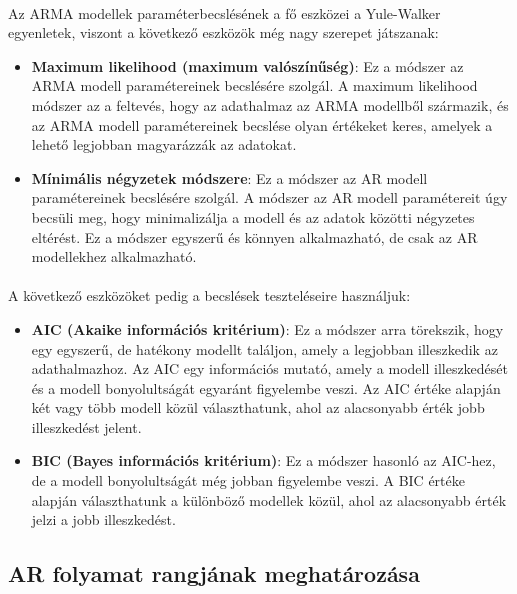 \documentclass[11pt,a4paper]{article}
\begin{document}
					\paragraph{}
						Az ARMA modellek paraméterbecslésének a fő eszközei a Yule-Walker egyenletek, viszont a következő eszközök még nagy szerepet játszanak:
						\begin{itemize}
							\item \textbf{Maximum likelihood (maximum valószínűség)}: Ez a módszer az ARMA modell paramétereinek becslésére szolgál. A maximum likelihood módszer az a feltevés, hogy az adathalmaz az ARMA modellből származik, és az ARMA modell paramétereinek becslése olyan értékeket keres, amelyek a lehető legjobban magyarázzák az adatokat.
							
							\item \textbf{Mínimális négyzetek módszere}: Ez a módszer az AR modell paramétereinek becslésére szolgál. A módszer az AR modell paramétereit úgy becsüli meg, hogy minimalizálja a modell és az adatok közötti négyzetes eltérést. Ez a módszer egyszerű és könnyen alkalmazható, de csak az AR modellekhez alkalmazható.
						\end{itemize}
						
					\paragraph{}
						A következő eszközöket pedig a becslések teszteléseire használjuk:
						\begin{itemize}
							\item \textbf{AIC (Akaike információs kritérium)}: Ez a módszer arra törekszik, hogy egy egyszerű, de hatékony modellt találjon, amely a legjobban illeszkedik az adathalmazhoz. Az AIC egy információs mutató, amely a modell illeszkedését és a modell bonyolultságát egyaránt figyelembe veszi. Az AIC értéke alapján két vagy több modell közül választhatunk, ahol az alacsonyabb érték jobb illeszkedést jelent.
							\item \textbf{BIC (Bayes információs kritérium)}: Ez a módszer hasonló az AIC-hez, de a modell bonyolultságát még jobban figyelembe veszi. A BIC értéke alapján választhatunk a különböző modellek közül, ahol az alacsonyabb érték jelzi a jobb illeszkedést.
						\end{itemize}
				\subsection{AR folyamat rangjának meghatározása}
\end{document}
